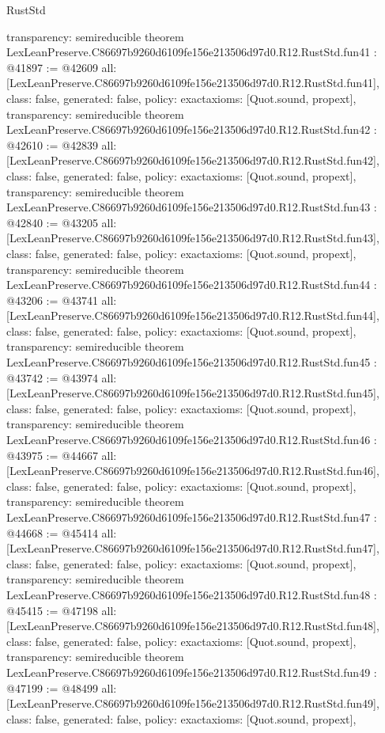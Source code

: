 \begin{lexlean}{RustStd}
\begin{coremodule}
{  transparency: semireducible
}
theorem LexLeanPreserve.C86697b9260d6109fe156e213506d97d0.R12.RustStd.fun41 : @41897 := @42609 {
  all: [LexLeanPreserve.C86697b9260d6109fe156e213506d97d0.R12.RustStd.fun41],
  class: false,
  generated: false,
  policy: exact{axioms: [Quot.sound, propext]},
  transparency: semireducible
}
theorem LexLeanPreserve.C86697b9260d6109fe156e213506d97d0.R12.RustStd.fun42 : @42610 := @42839 {
  all: [LexLeanPreserve.C86697b9260d6109fe156e213506d97d0.R12.RustStd.fun42],
  class: false,
  generated: false,
  policy: exact{axioms: [Quot.sound, propext]},
  transparency: semireducible
}
theorem LexLeanPreserve.C86697b9260d6109fe156e213506d97d0.R12.RustStd.fun43 : @42840 := @43205 {
  all: [LexLeanPreserve.C86697b9260d6109fe156e213506d97d0.R12.RustStd.fun43],
  class: false,
  generated: false,
  policy: exact{axioms: [Quot.sound, propext]},
  transparency: semireducible
}
theorem LexLeanPreserve.C86697b9260d6109fe156e213506d97d0.R12.RustStd.fun44 : @43206 := @43741 {
  all: [LexLeanPreserve.C86697b9260d6109fe156e213506d97d0.R12.RustStd.fun44],
  class: false,
  generated: false,
  policy: exact{axioms: [Quot.sound, propext]},
  transparency: semireducible
}
theorem LexLeanPreserve.C86697b9260d6109fe156e213506d97d0.R12.RustStd.fun45 : @43742 := @43974 {
  all: [LexLeanPreserve.C86697b9260d6109fe156e213506d97d0.R12.RustStd.fun45],
  class: false,
  generated: false,
  policy: exact{axioms: [Quot.sound, propext]},
  transparency: semireducible
}
theorem LexLeanPreserve.C86697b9260d6109fe156e213506d97d0.R12.RustStd.fun46 : @43975 := @44667 {
  all: [LexLeanPreserve.C86697b9260d6109fe156e213506d97d0.R12.RustStd.fun46],
  class: false,
  generated: false,
  policy: exact{axioms: [Quot.sound, propext]},
  transparency: semireducible
}
theorem LexLeanPreserve.C86697b9260d6109fe156e213506d97d0.R12.RustStd.fun47 : @44668 := @45414 {
  all: [LexLeanPreserve.C86697b9260d6109fe156e213506d97d0.R12.RustStd.fun47],
  class: false,
  generated: false,
  policy: exact{axioms: [Quot.sound, propext]},
  transparency: semireducible
}
theorem LexLeanPreserve.C86697b9260d6109fe156e213506d97d0.R12.RustStd.fun48 : @45415 := @47198 {
  all: [LexLeanPreserve.C86697b9260d6109fe156e213506d97d0.R12.RustStd.fun48],
  class: false,
  generated: false,
  policy: exact{axioms: [Quot.sound, propext]},
  transparency: semireducible
}
theorem LexLeanPreserve.C86697b9260d6109fe156e213506d97d0.R12.RustStd.fun49 : @47199 := @48499 {
  all: [LexLeanPreserve.C86697b9260d6109fe156e213506d97d0.R12.RustStd.fun49],
  class: false,
  generated: false,
  policy: exact{axioms: [Quot.sound, propext]},
}
\end{coremodule}
\end{lexlean}
